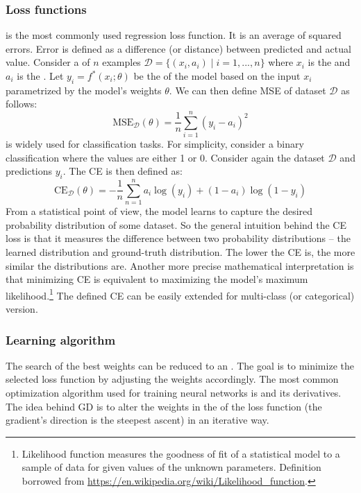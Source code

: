 \subsubsection{Loss functions}

 is the most commonly used regression loss
function. It is an average of squared errors. Error is defined as a difference
(or distance) between predicted and actual value. Consider a  of $n$
examples $\mathcal{D} = \{(x_i, a_i)\mid i = 1,...,n\}$ where $x_i$ is the 
and $a_i$ is the . Let $y_i = f^*(x_i; \theta)$ be the  of the model based on the input $x_i$ parametrized by the model's weights
$\theta$. We can then define MSE of dataset $\mathcal{D}$ as follows:
$$
    \text{MSE}_{\mathcal{D}}(\theta) =
    \frac{1}{n}\sum\limits^{n}_{i=1}(y_i - a_i)^2
$$
 is widely used for classification tasks. For
simplicity, consider a binary classification where the values are either 1 or 0.
Consider again the dataset $\mathcal{D}$ and predictions $y_i$. The CE is then
defined as:
$$
    \text{CE}_\mathcal{D}(\theta) =
    -\frac{1}{n}\sum\limits_{n=1}^{n} a_i \log(y_i) + (1-a_i)\log(1-y_i)
$$
From a statistical point of view, the model learns to capture
the desired probability distribution of some dataset. So the general intuition
behind the CE loss is that it measures the difference between two probability
distributions -- the learned distribution and ground-truth distribution. The
lower the CE is, the more similar the distributions are. Another more precise
mathematical interpretation is that minimizing CE is equivalent to maximizing
the model's maximum likelihood.\footnote{Likelihood function measures the
    goodness of fit of a statistical model to a sample of data for given values
    of the unknown parameters. Definition borrowed from
    \url{https://en.wikipedia.org/wiki/Likelihood_function}.
} The defined CE can be easily extended for multi-class (or categorical)
version.

\subsubsection{Learning algorithm}
The search of the best weights can be reduced to an . The
goal is to minimize the selected loss function by adjusting the weights
accordingly. The most common optimization algorithm used for training neural
networks is  and its derivatives. The idea behind GD
is to alter the weights in the  of the
loss function (the gradient's direction is the steepest ascent) in an iterative
way.

